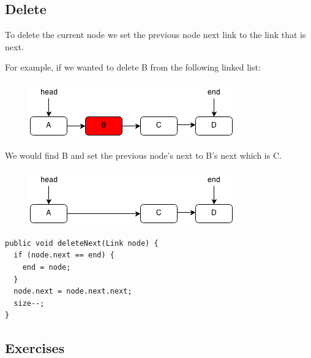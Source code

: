 \documentclass[11pt,oneside]{book}
\makeatletter
\def\maxwidth#1{\ifdim\Gin@nat@width>#1 #1\else\Gin@nat@width\fi}
\makeatother
\begin{document}
\subsection{Delete}

To delete the current node we set the previous node next link to the link that is next.

For example, if we wanted to delete B from the following linked list:

\vspace{5px}\begin{figure}[H]\centering
        \includegraphics[width=0.66\maxwidth{\textwidth}]{linkedlistrem.png}
        \end{figure}

We would find B and set the previous node's next to B's next which is C.

\vspace{5px}\begin{figure}[H]\centering
        \includegraphics[width=0.66\maxwidth{\textwidth}]{linkedlistrem2.png}
        \end{figure}

\begin{lstlisting}
public void deleteNext(Link node) {
  if (node.next == end) {
    end = node;
  }
  node.next = node.next.next;
  size--;
}
\end{lstlisting}

\subsection{Exercises}
\end{document}
